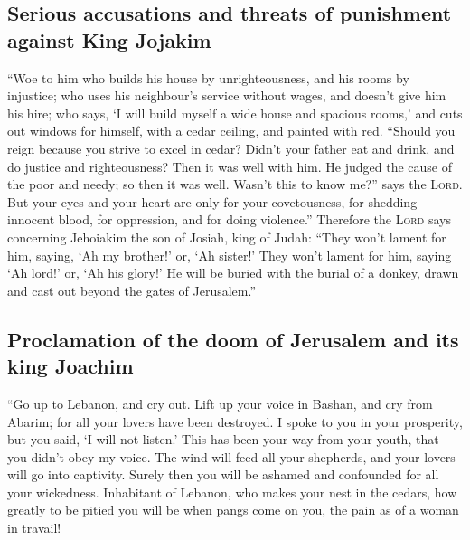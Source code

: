 \hypertarget{serious-accusations-and-threats-of-punishment-against-king-jojakim}{%
\subsection{Serious accusations and threats of punishment against King
Jojakim}\label{serious-accusations-and-threats-of-punishment-against-king-jojakim}}

 ``Woe to him who builds his house by unrighteousness,
and his rooms by injustice; who uses his neighbour's service without
wages, and doesn't give him his hire;  who says, `I will
build myself a wide house and spacious rooms,' and cuts out windows for
himself, with a cedar ceiling, and painted with red. 
``Should you reign because you strive to excel in cedar? Didn't your
father eat and drink, and do justice and righteousness? Then it was well
with him.  He judged the cause of the poor and needy; so
then it was well. Wasn't this to know me?'' says the \textsc{Lord}.
 But your eyes and your heart are only for your
covetousness, for shedding innocent blood, for oppression, and for doing
violence.''  Therefore the \textsc{Lord} says concerning
Jehoiakim the son of Josiah, king of Judah: ``They won't lament for him,
saying, `Ah my brother!' or, `Ah sister!' They won't lament for him,
saying `Ah lord!' or, `Ah his glory!'  He will be buried
with the burial of a donkey, drawn and cast out beyond the gates of
Jerusalem.''

\hypertarget{proclamation-of-the-doom-of-jerusalem-and-its-king-joachim}{%
\subsection{Proclamation of the doom of Jerusalem and its king
Joachim}\label{proclamation-of-the-doom-of-jerusalem-and-its-king-joachim}}

 ``Go up to Lebanon, and cry out. Lift up your voice in
Bashan, and cry from Abarim; for all your lovers have been destroyed.
 I spoke to you in your prosperity, but you said, `I will
not listen.' This has been your way from your youth, that you didn't
obey my voice.  The wind will feed all your shepherds,
and your lovers will go into captivity. Surely then you will be ashamed
and confounded for all your wickedness.  Inhabitant of
Lebanon, who makes your nest in the cedars, how greatly to be pitied you
will be when pangs come on you, the pain as of a woman in travail!

